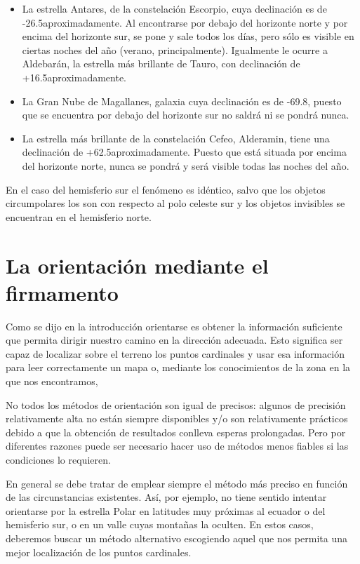 \documentclass[11pt,a5paper,twoside]{amsbook}
\begin{document}
\begin{itemize}
 \item La estrella Antares, de la constelación Escorpio, cuya declinación es de -26.5\textdegree aproximadamente. Al encontrarse por debajo del horizonte norte y por encima del horizonte sur, se pone y sale todos los días, pero sólo es visible en ciertas noches del año (verano, principalmente). Igualmente le ocurre a Aldebarán, la estrella más brillante de Tauro, con declinación de +16.5\textdegree aproximadamente.
 \item La Gran Nube de Magallanes, galaxia cuya declinación es de -69.8\textdegree, puesto que se encuentra por debajo del horizonte sur no saldrá ni se pondrá nunca.
 \item La estrella más brillante de la constelación Cefeo, Alderamin, tiene una declinación de +62.5\textdegree  aproximadamente. Puesto que está situada por encima del horizonte norte, nunca se pondrá y será visible todas las noches del año.
\end{itemize}

En el caso del hemisferio sur el fenómeno es idéntico, salvo que los objetos circumpolares los son con respecto al polo celeste sur y los objetos invisibles se encuentran en el hemisferio norte. 

\section{La orientación mediante el firmamento}

Como se dijo en la introducción orientarse es obtener la información suficiente que permita  dirigir nuestro camino en la dirección adecuada. Esto significa ser capaz de localizar sobre el terreno los puntos cardinales y usar esa información para leer correctamente un mapa o, mediante los conocimientos de la zona en la que nos encontramos,

No todos los métodos de orientación son igual de precisos: algunos de precisión relativamente alta no están siempre disponibles y/o son relativamente prácticos debido a que la obtención de resultados conlleva esperas prolongadas. Pero por diferentes razones puede ser necesario hacer uso de métodos menos fiables si las condiciones lo requieren. 

En general se debe tratar de emplear siempre el método más preciso en función de las circunstancias existentes. Así, por ejemplo, no tiene sentido intentar orientarse por la estrella Polar en latitudes muy próximas al ecuador o del hemisferio sur, o en un valle cuyas montañas la oculten. En estos casos, deberemos buscar un método alternativo escogiendo aquel que nos permita una mejor localización de los puntos cardinales.
\end{document}
